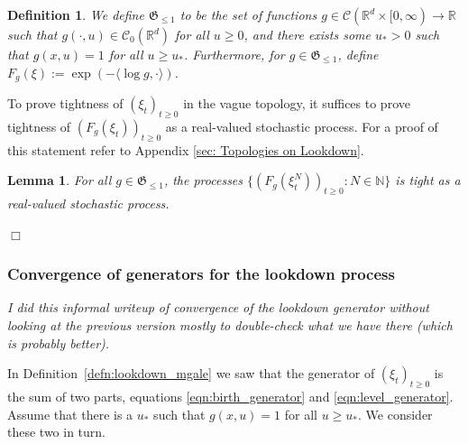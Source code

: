 \documentclass[12pt]{article}
\newenvironment {proof}{{\noindent\bf Proof }}{\hfill $\Box$ \medskip}
\newtheorem{lemma}[theorem]{Lemma}
\newtheorem{definition}[theorem]{Definition}
\newcommand{\IR}{\mathbb R}
\newcommand{\lp}{\xi}              %
\newcommand{\comment}[1]{{\color{blue} \it #1}}
\begin{document}
\begin{definition}
We define $\mathfrak{G}_{\leq 1}$ to be the set of functions $g \in \mathcal{C}(\IR^d \times [0, \infty) \to \IR$ such that 
$g(\cdot, u) \in \mathcal{C}_{0}(\IR^d)$ for all $u \geq 0$, and there exists some $u_{*}>0$ such that $g(x,u)=1$ for all $u \geq u_{*}$. Furthermore, for $g \in \mathfrak{G}_{\leq 1}$, define $F_g(\xi):= \exp(-\langle \log g, \cdot \rangle )$.
\end{definition}

To prove tightness of $(\xi_t)_{t \geq 0}$ in the vague topology, it suffices to prove tightness of $(F_g(\xi_t))_{t \geq 0}$ as a real-valued stochastic process. For a proof of this statement refer to Appendix \ref{sec: Topologies on Lookdown}.

\begin{lemma}
For all $g \in \mathfrak{G}_{\leq 1}$, the processes $\{(F_g(\xi^N_t))_{t \geq 0}: N \in \mathbb{N}\}$ is tight as a real-valued stochastic process.
\end{lemma}
\begin{proof}

\end{proof}


\subsubsection{Convergence of generators for the lookdown process}
    \label{sec:lookdown_generator_proofs}


\comment{
    I did this informal writeup of convergence of the lookdown generator
    without looking at the previous version
    mostly to double-check what we have there
    (which is probably better).
}

In Definition~\ref{defn:lookdown_mgale} we saw that the generator
of $(\lp_t)_{t \ge 0}$ is the sum of two parts,
equations \eqref{eqn:birth_generator} and \eqref{eqn:level_generator}.
Assume that there is a $u_*$ such that $g(x, u) = 1$ for all $u \ge u_*$.
We consider these two in turn.
\end{document}
